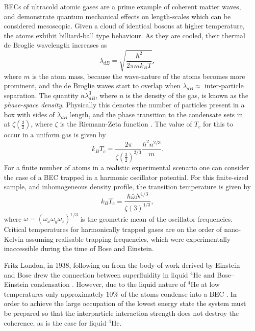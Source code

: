 BECs of ultracold atomic gases are a prime example of coherent matter waves, and demonstrate quantum mechanical effects on length-scales which can be considered mesoscopic. Given a cloud of identical bosons at higher temperature, the atoms exhibit billiard-ball type behaviour. As they are cooled, their thermal de Broglie wavelength increases as
\begin{equation}
\lambda_{dB} = \sqrt{\frac{\hbar^2}{2\pi mk_{B}T}},
\end{equation}
where $m$ is the atom mass, because the wave-nature of the atoms becomes more prominent, and the de Broglie waves start to overlap when $\lambda_{dB} \approx$ inter-particle separation. The quantity $n\lambda_{dB}^3$, where $n$ is the density of the gas, is known as the \emph{phase-space density}. Physically this denotes the number of particles present in a box with sides of $\lambda_{dB}$ length, and the phase transition to the condensate sets in at $\zeta\left(\frac{3}{2}\right)$, where $\zeta$ is the Riemann-Zeta function \cite{BK:Ueda_2010}. The value of $T_c$ for this to occur in a uniform gas is given by
\begin{equation}
k_BT_c = \frac{2\pi}{\zeta\left(\frac{3}{2}\right)^{2/3}}\frac{\hbar^2n^{2/3}}{m}.
\end{equation}
For a finite number of atoms in a realistic experimental scenario one can consider the case of a BEC trapped in a harmonic oscillator potential. For this finite-sized sample, and inhomogeneous density profile, the transition temperature is given by
\begin{equation}
k_BT_c = \frac{\hbar\bar{\omega}N^{1/3}}{\zeta(3)^{1/3}},
\end{equation}
where $\bar{\omega}=(\omega_x\omega_y\omega_z)^{1/3}$ is the geometric mean of the oscillator frequencies. Critical temperatures for harmonically trapped gases are on the order of nano-Kelvin assuming realisable trapping frequencies, which were experimentally inaccessible during the time of Bose and Einstein.

Fritz London, in 1938, following on from the body of work derived by Einstein and Bose drew the connection between superfluidity in liquid $^4$He and Bose--Einstein condensation \cite[Chap.~1]{BK:Pitaevskii_Stringari_2003}. However, due to the liquid nature of $^4$He at low temperatures only approximately $10\%$ of the atoms condense into a BEC \cite{BEC:Penrose_pr_1956}. In order to achieve the large occupation of the lowest energy state the system must be prepared so that the interparticle interaction strength does not destroy the coherence, as is the case for liquid $^4$He.

